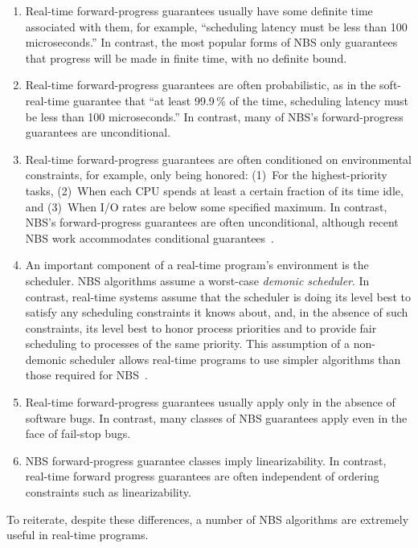 \begin{enumerate}
\item	Real-time forward-progress guarantees usually have some
	definite time associated with them, for example,
	``scheduling latency must be less than 100 microseconds.''
	In contrast, the most popular forms of NBS only guarantees
	that progress will be made in finite time, with no definite
	bound.
\item	Real-time forward-progress guarantees are often
	probabilistic, as in the soft-real-time guarantee that
	``at least 99.9\,\% of the time, scheduling latency must
	be less than 100 microseconds.''
	In contrast, many of NBS's forward-progress guarantees are
	unconditional.
\item	Real-time forward-progress guarantees are often conditioned on
	environmental constraints, for example, only being honored:
	(1)~For the highest-priority tasks,
	(2)~When each CPU spends at least a certain fraction of its time idle,
	and (3)~When I/O rates are below some specified maximum.
	In contrast, NBS's forward-progress
	guarantees are often unconditional, although recent NBS work
	accommodates conditional
	guarantees~\cite{DanAlitarh2013PracticalProgress}.
\item	An important component of a real-time program's environment
	is the scheduler.
	NBS algorithms assume a worst-case \emph{demonic scheduler}.
	In contrast, real-time systems assume that the scheduler is
	doing its level best to satisfy any scheduling constraints
	it knows about, and, in the absence of such constraints,
	its level best to honor process priorities and to provide
	fair scheduling to processes of the same priority.
	This assumption of a non-demonic scheduler allows real-time
	programs to use simpler algorithms than those required for
	NBS~\cite{DanAlitarh2013PracticalProgress,BjoernBrandenburgPhD}.
\item	Real-time forward-progress guarantees usually apply only
	in the absence of software bugs.
	In contrast, many classes of NBS guarantees apply even in the
	face of fail-stop bugs.
\item	NBS forward-progress guarantee classes imply linearizability.
	In contrast, real-time forward progress guarantees are often
	independent of ordering constraints such as linearizability.
\end{enumerate}

To reiterate, despite these differences, a number of NBS algorithms are
extremely useful in real-time programs.

